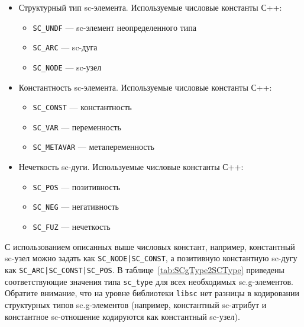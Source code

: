 \begin{itemize}
\item Структурный тип sc-элемента. Используемые числовые константы
  С++:
  \begin{itemize}
  \item \lstinline{SC_UNDF} --- sc-элемент неопределенного типа
  \item \lstinline{SC_ARC} --- sc-дуга
  \item \lstinline{SC_NODE} --- sc-узел
  \end{itemize}

\item Константность sc-элемента. Используемые числовые константы С++:
  \begin{itemize}
  \item \lstinline{SC_CONST} --- константность
  \item \lstinline{SC_VAR} --- переменность
  \item \lstinline{SC_METAVAR} --- метапеременность
  \end{itemize}

\item Нечеткость sc-дуги. Используемые числовые константы С++:
  \begin{itemize}
  \item \lstinline{SC_POS} --- позитивность
  \item \lstinline{SC_NEG} --- негативность
  \item \lstinline{SC_FUZ} --- нечеткость
  \end{itemize}
\end{itemize}

С использованием описанных выше числовых констант, например,
константный sc-узел можно задать как \lstinline{SC_NODE|SC_CONST}, а
позитивную константную sc-дугу как
\lstinline{SC_ARC|SC_CONST|SC_POS}. В таблице~\ref{tab:SCgType2SCType}
приведены соответствующие значения типа \lstinline{sc_type} для всех
необходимых sc.g-элементов. Обратите внимание, что на уровне
библиотеки \texttt{libsc} нет разницы в кодировании структурных типов
sc.g-элементов (например, константный sc-атрибут и константное
sc-отношение кодируются как константный sc-узел).

